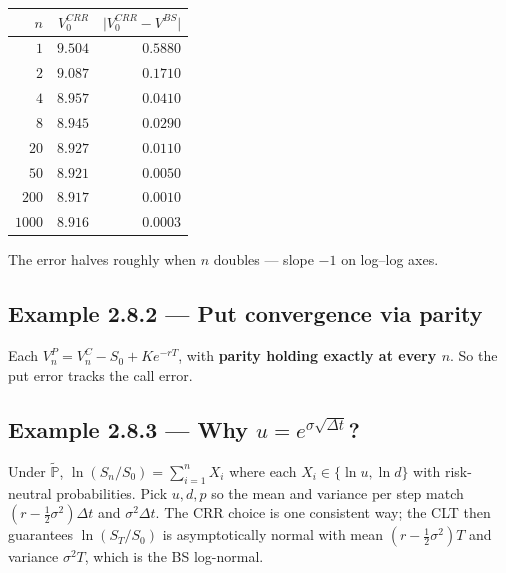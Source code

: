 \documentclass[
  10pt,
  twoside]{book}
\newcounter{none} %
\begin{document}
{\def\LTcaptype{none} %
\begin{table}[H]
\centering
\begin{tabular}{|r|r|r|}
\toprule
\(n\) & \(V_0^{CRR}\) & \(\lvert V_0^{CRR}-V^{BS}\rvert\) \\
\midrule



\(\phantom{000}1\) & \(9.504\) & \(0.5880\) \\
\(\phantom{000}2\) & \(9.087\) & \(0.1710\) \\
\(\phantom{000}4\) & \(8.957\) & \(0.0410\) \\
\(\phantom{000}8\) & \(8.945\) & \(0.0290\) \\
\(\phantom{00}20\) & \(8.927\) & \(0.0110\) \\
\(\phantom{00}50\) & \(8.921\) & \(0.0050\) \\
\(\phantom{0}200\) & \(8.917\) & \(0.0010\) \\
\(1000\) & \(8.916\) & \(0.0003\) \\
\bottomrule
\end{tabular}
\end{table}
}

The error halves roughly when \(n\) doubles --- slope \(-1\) on log--log
axes.

\subsection{Example 2.8.2 --- Put convergence via
parity}\label{example-2.8.2-put-convergence-via-parity}

Each \(V^P_n = V^C_n - S_0 + Ke^{-rT}\), with \textbf{parity holding
exactly at every \(n\)}. So the put error tracks the call error.

\subsection{\texorpdfstring{Example 2.8.3 --- Why
\(u=e^{\sigma\sqrt{\Delta t}}\)?}{Example 2.8.3 --- Why u=e\^{}\{\textbackslash sigma\textbackslash sqrt\{\textbackslash Delta t\}\}?}}\label{example-2.8.3-why-uesigmasqrtdelta-t}

Under \(\tilde{\mathbb P}\), \(\ln(S_n/S_0) = \sum_{i=1}^n X_i\) where
each \(X_i\in\{\ln u,\ln d\}\) with risk-neutral probabilities. Pick
\(u,d,p\) so the mean and variance per step match
\((r-\tfrac12\sigma^2)\Delta t\) and \(\sigma^2\Delta t\). The CRR
choice is one consistent way; the CLT then guarantees \(\ln(S_T/S_0)\)
is asymptotically normal with mean \((r-\tfrac12\sigma^2)T\) and
variance \(\sigma^2 T\), which is the BS log-normal.
\end{document}
